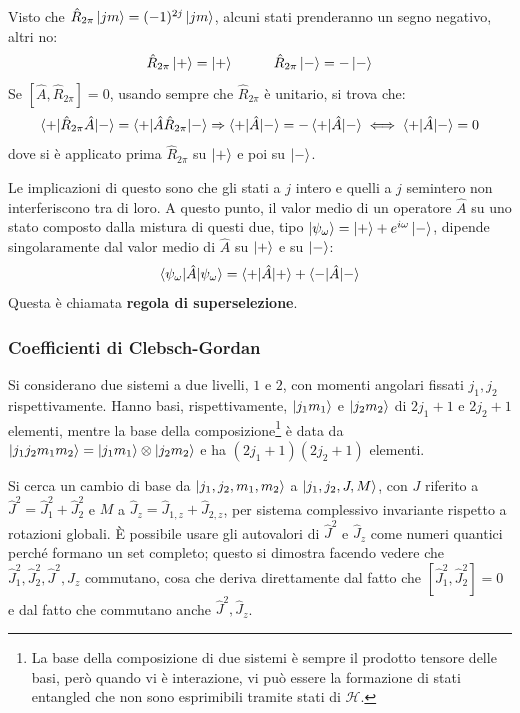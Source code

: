 \documentclass[11pt, a4paper]{scrartcl} %
\numberwithin{equation}{subsection}
\theoremstyle{style2}
\theoremstyle{style1}
\begin{document}
Visto che $\hat{R}_{2\pi} \ket{jm} = (-1)^{2j} \ket{jm} $, alcuni stati prenderanno un segno negativo, altri no:
\[
	\hat{R}_{2\pi} \ket{+} = \ket{+} \hspace{1cm} \hat{R}_{2\pi} \ket{-} = - \ket{-} 
\] 
Se $\left[ \hat{A}, \hat{R}_{2\pi}  \right] = 0 $, usando sempre che $\hat{R}_{2\pi} $ \`e unitario, si trova che:
\begin{equation*}
	\braket{+|\hat{R}_{2\pi} \hat{A}|-} = \braket{+|\hat{A}\hat{R}_{2\pi} |-} \Rightarrow \braket{+|\hat{A}|-} = - \braket{+|\hat{A}|-} \iff  \braket{+|\hat{A}|-} =0
\end{equation*}
dove si \`e applicato prima $\hat{R}_{2\pi} $ su $\ket{+} $ e poi su $\ket{-} $.

Le implicazioni di questo sono che gli stati a $j$ intero e quelli a $j$ semintero non interferiscono tra di loro.
A questo punto, il valor medio di un operatore $\hat{A}$ su uno stato composto dalla mistura di questi due, tipo $\ket{\psi _\omega} = \ket{+} + e^{i\omega} \ket{-}  $, dipende singolaramente dal valor medio di $\hat{A}$ su $\ket{+} $ e su $\ket{-} $:
\[
\braket{\psi _\omega|\hat{A}|\psi _\omega} = \braket{+|\hat{A}|+} + \braket{-|\hat{A}|-} 
\] 
Questa \`e chiamata \textbf{regola di superselezione}.

\subsubsection{Coefficienti di Clebsch-Gordan}
Si considerano due sistemi a due livelli, $1$ e $2$, con momenti angolari fissati $j_1,j_2$ rispettivamente. Hanno basi, rispettivamente, $\ket{j_1m_1} $ e $\ket{j_2m_2} $ di $2j_1+1$ e $2j_2+1$ elementi, mentre la base della composizione\footnote{La base della composizione di due sistemi \`e sempre il prodotto tensore delle basi, per\`o quando vi \`e interazione, vi pu\`o essere la formazione di stati entangled che non sono esprimibili tramite stati di $\mathcal{H}$.} \`e data da $\ket{j_1j_2m_1m_2} = \ket{j_1m_1} \otimes \ket{j_2m_2} $ e ha $(2j_1+1)(2j_2+1)$ elementi.

Si cerca un cambio di base da $\ket{j_1,j_2,m_1,m_2} $ a $\ket{j_1,j_2,J,M} $, con $J$ riferito a $\hat{J}^2 = \hat{J}_1^2  + \hat{J}^2_2 $ e $M$ a $\hat{J}_z=\hat{J}_{1,z}  + \hat{J}_{2,z} $, per sistema complessivo invariante rispetto a rotazioni globali.
\`E possibile usare gli autovalori di $\hat{J}^2$ e $\hat{J}_z$ come numeri quantici perch\'e formano un set completo; questo si dimostra facendo vedere che $\hat{J}^2_1 , \hat{J}_2^2 , \hat{J}^2, \hat{J}_z$ commutano, cosa che deriva direttamente dal fatto che $\left[ \hat{J}^2_1 , \hat{J}_2^2  \right] =0$ e dal fatto che commutano anche $\hat{J}^2 , \hat{J}_{z} $.
\end{document}
